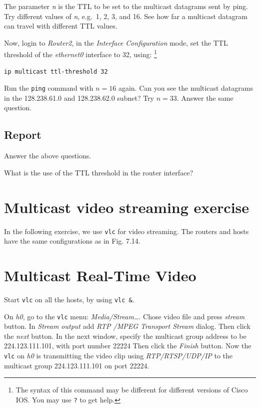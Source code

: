 \documentclass{../UTNetLab}
\begin{document}
    The parameter \textit{n} is the TTL to be set to the multicast datagrams sent by ping.
    Try different values of \textit{n}, e.g.\ 1, 2, 3, and 16.
    See how far a multicast datagram can travel with different TTL values. 

    Now, login to \textit{Router2}, in the \textit{Interface Configuration} mode, set the TTL threshold of the \textit{ethernet0} interface to 32, using: 
    \footnote{The syntax of this command may be different for different versions of Cisco IOS. You may use \lstinline[language={cisco}]{?} to get help.}
    \begin{lstlisting}[language={cisco}]    
ip multicast ttl-threshold 32
    \end{lstlisting}

    Run the \lstinline{ping} command with $n = 16$ again.
    Can you see the multicast datagrams in the 128.238.61.0 and 128.238.62.0 subnet?
    Try $n = 33$.
    Answer the same question.
    
    \subsection*{Report}
    Answer the above questions. 

    What is the use of the TTL threshold in the router interface?

\section*{Multicast video streaming exercise}
    In the following exercise, we use \lstinline{vlc} for video streaming.
    The routers and hosts have the same configurations as in Fig. 7.14.

\section{Multicast Real-Time Video}
    Start \lstinline{vlc} on all the hosts, by using \lstinline{vlc &}. 

    On \textit{h0}, go to the \lstinline{vlc} menu: \textit{Media/Stream\ldots }. Chose video file  and press \textit{stream} button. In \textit{Stream output} add \textit{RTP /MPEG Transport Stream} dialog.
    Then click the \textit{next} button.
    In the next window, specify the multicast group address to be {224.123.111.101}, with port number {22224} %
    Then click the \textit{Finish} button.
    Now the \lstinline{vlc} on \textit{h0} is transmitting the video clip using \textit{RTP/RTSP/UDP/IP} to the multicast group {224.123.111.101} on port {22224}. 
\end{document}
